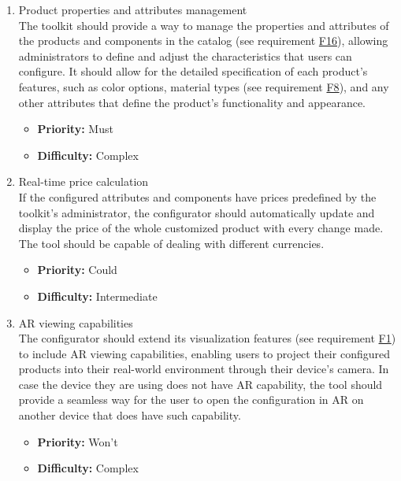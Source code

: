 \begin{enumerate}[label=\textbf{F\arabic*:}, leftmargin=*]
\item \label{itm:F17} Product properties and attributes management
\vspace{2pt}
\\The toolkit should provide a way to manage the properties and attributes of the products and components in the catalog (see requirement \hyperref[itm:F16]{F16}), allowing administrators to define and adjust the characteristics that users can configure. It should allow for the detailed specification of each product's features, such as color options, material types (see requirement \hyperref[itm:F8]{F8}), and any other attributes that define the product's functionality and appearance.
\begin{itemize}[noitemsep, label=\trianglebullet]
    \item \textbf{Priority:} Must
    \item \textbf{Difficulty:} Complex
\end{itemize}
\vspace{4pt}


\item \label{itm:F18} Real-time price calculation
\vspace{2pt}
\\If the configured attributes and components have prices predefined by the toolkit's administrator, the configurator should automatically update and display the price of the whole customized product with every change made. The tool should be capable of dealing with different currencies.
\begin{itemize}[noitemsep, label=\trianglebullet]
    \item \textbf{Priority:} Could
    \item \textbf{Difficulty:} Intermediate
\end{itemize}
\vspace{4pt}

\item \label{itm:F19} AR viewing capabilities
\vspace{2pt}
\\The configurator should extend its visualization features (see requirement \hyperref[itm:F1]{F1}) to include AR viewing capabilities, enabling users to project their configured products into their real-world environment through their device's camera. In case the device they are using does not have AR capability, the tool should provide a seamless way for the user to open the configuration in AR on another device that does have such capability.
\begin{itemize}[noitemsep, label=\trianglebullet]
    \item \textbf{Priority:} Won't
    \item \textbf{Difficulty:} Complex
\end{itemize}
\vspace{4pt}


\end{enumerate}
